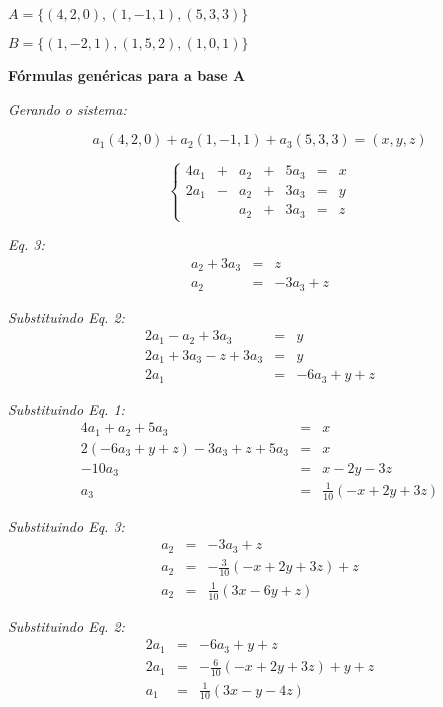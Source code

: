 \documentclass[11pt]{article}
\newenvironment{question}[1]
  {\par\addvspace{\medskipamount}
   \noindent\makebox[0pt][r]{\textbf{#1)} }\ignorespaces}
  {\par\addvspace{\medskipamount}}
\begin{document}
\begin{question}{1}
$A=\{(4, 2, 0),(1, -1, 1),(5, 3, 3)\}$

$B=\{(1, -2, 1),(1, 5, 2),(1, 0, 1)\}$

\bigskip
\textbf{Fórmulas genéricas para a base A}

\bigskip
\textit{Gerando o sistema:} 

$$a_1(4,2,0)+a_2(1,-1,1)+a_3(5,3,3)=(x,y,z)$$

$$
\left\{\begin{array}{rcrcrcr}
    4a_1 &+ &a_2 &+ &5a_3 &= &x\\
    2a_1 &- &a_2 &+ &3a_3 &= &y\\
         &  &a_2 &+ &3a_3 &= &z
\end{array}\right.
$$

\textit{Eq. 3:}
$$
\begin{array}{rcl}
    a_2+3a_3 &= &z\\
    a_2 &= &-3a_3+z
\end{array}
$$

\bigskip
\textit{Substituindo Eq. 2:}
$$
\begin{array}{rcl}
    2a_1-a_2+3a_3 &= &y\\
    2a_1+3a_3-z+3a_3 &= &y\\
    2a_1 &= &-6a_3+y+z
\end{array}
$$

\bigskip
\textit{Substituindo Eq. 1:}
$$
\begin{array}{rcl}
    4a_1+a_2+5a_3 &= &x\\
    2(-6a_3+y+z)-3a_3+z+5a_3 &= &x\\
    -10a_3 &= &x-2y-3z\\
    a_3 &= &\frac{1}{10}(-x+2y+3z)
\end{array}
$$

\bigskip
\textit{Substituindo Eq. 3:}
$$
\begin{array}{rcl}
    a_2 &= &-3a_3+z\\
    a_2 &= &-\frac{3}{10}(-x+2y+3z)+z\\
    a_2 &= &\frac{1}{10}(3x-6y+z)
\end{array}
$$

\bigskip
\textit{Substituindo Eq. 2:}
$$
\begin{array}{rcl}
    2a_1 &= &-6a_3+y+z\\
    2a_1 &= &-\frac{6}{10}(-x+2y+3z)+y+z\\
    a_1 &= &\frac{1}{10}(3x-y-4z)
\end{array}
$$


\end{question}
\end{document}

